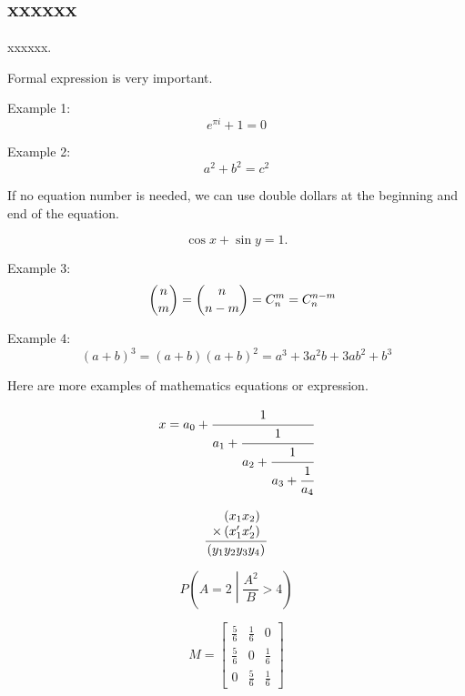 \documentclass{article}
\begin{document}
\subsection{xxxxxx}

xxxxxx.

Formal expression is very important.

Example 1:
\begin{equation}
\label{eq1}
	e^{\pi i}+1=0
\end{equation}

Example 2:
\begin{equation}
\label{eq2}
	a^2+b^2=c^2
\end{equation}

If no equation number is needed, we can use double dollars at the beginning and end of the equation.

$$
\cos{x}+\sin{y}=1.
$$

Example 3:
\begin{equation}
\label{eq3}
\quad\dbinom{n}{m}=\dbinom{n}{n-m}=C_n^m=C_n^{n-m}
\end{equation}

Example 4:
\begin{equation}
    (a + b)^3 = (a + b) (a + b)^2=a^3 + 3a^2b + 3ab^2 + b^3     
\end{equation}

Here are more examples of mathematics equations or expression.


\begin{equation}
  x = a_0 + \cfrac{1}{a_1 
          + \cfrac{1}{a_2 
          + \cfrac{1}{a_3 + \cfrac{1}{a_4} } } }
\end{equation}




\begin{equation*}
\frac{
    \begin{array}[b]{r}
      \left( x_1 x_2 \right)\\
      \times \left( x'_1 x'_2 \right)
    \end{array}
  }{
    \left( y_1y_2y_3y_4 \right)
  }
\end{equation*}


\[
P\left(A=2\middle|\frac{A^2}{B}>4\right)
\]


\[
M = \begin{bmatrix}
       \frac{5}{6} & \frac{1}{6} & 0           \\[0.3em]
       \frac{5}{6} & 0           & \frac{1}{6} \\[0.3em]
       0           & \frac{5}{6} & \frac{1}{6}
     \end{bmatrix}
\]
\end{document}
